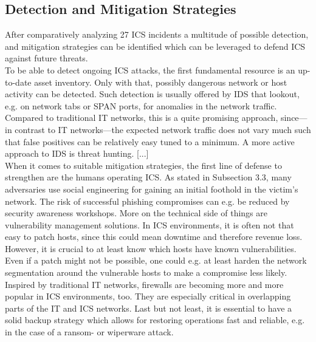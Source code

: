 \documentclass[runningheads]{llncs}
\begin{document}
\subsection{Detection and Mitigation Strategies}
After comparatively analyzing 27 ICS incidents a multitude of possible detection, and mitigation strategies can be identified which can be leveraged to defend ICS against future threats.\\
To be able to detect ongoing ICS attacks, the first fundamental resource is an up-to-date asset inventory.
Only with that, possibly dangerous network or host activity can be detected.
Such detection is usually offered by IDS that lookout, e.g. on network tabs or SPAN ports, for anomalies in the network traffic.
Compared to traditional IT networks, this is a quite promising approach, since---in contrast to IT networks---the expected network traffic does not vary much such that false positives can be relatively easy tuned to a minimum.
A more active approach to IDS is threat hunting.
[...]\\
When it comes to suitable mitigation strategies, the first line of defense to strengthen are the humans operating ICS.
As stated in Subsection 3.3, many adversaries use social engineering for gaining an initial foothold in the victim's network.
The risk of successful phishing compromises can e.g. be reduced by security awareness workshops.
More on the technical side of things are vulnerability management solutions.
In ICS environments, it is often not that easy to patch hosts, since this could mean downtime and therefore revenue loss.
However, it is crucial to at least know which hosts have known vulnerabilities.
Even if a patch might not be possible, one could e.g. at least harden the network segmentation around the vulnerable hosts to make a compromise less likely.
Inspired by traditional IT networks, firewalls are becoming more and more popular in ICS environments, too.
They are especially critical in overlapping parts of the IT and ICS networks.
Last but not least, it is essential to have a solid backup strategy which allows for restoring operations fast and reliable, e.g. in the case of a ransom- or wiperware attack.
\end{document}
